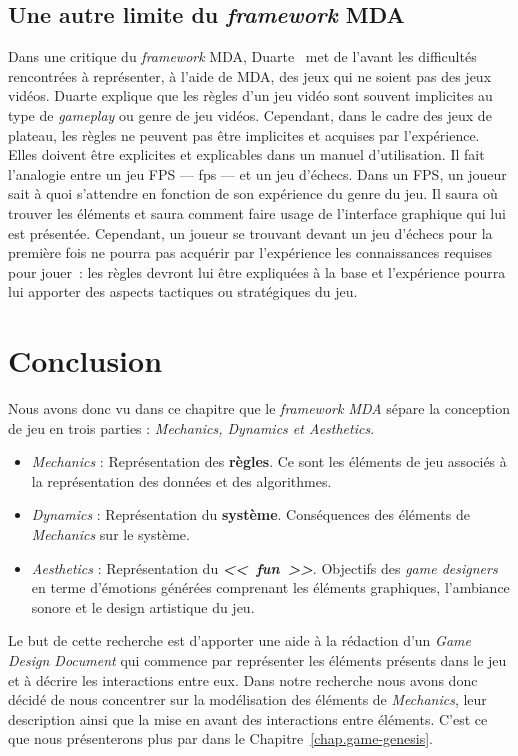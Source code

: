 \subsection{Une autre limite du \emph{framework} MDA}
Dans une critique du \emph{framework} MDA, Duarte~\cite{GAMA_MDA} met de l'avant les difficultés  rencontr\'ees à représenter, \`a l'aide de MDA, des jeux qui ne soient pas des jeux vidéos. 
Duarte explique que les règles d'un jeu vidéo sont souvent implicites au type de \emph{gameplay} ou genre de jeu vidéos. 
Cependant, dans le cadre des jeux de plateau, les règles ne peuvent pas être implicites et acquises par l'expérience. 
Elles doivent être explicites et explicables dans un manuel d'utilisation. 
Il fait l'analogie entre un jeu FPS --- \gls{fps} --- et un jeu d'échecs. Dans un FPS, un joueur sait à quoi s'attendre en fonction de son expérience du genre du jeu. 
Il saura o\`u trouver les éléments et saura comment faire usage de l'interface graphique qui lui est présentée. 
Cependant, un joueur se trouvant devant un jeu d'échecs pour la première fois ne pourra pas acquérir par l'exp\'erience les connaissances requises pour jouer~: les règles devront lui être expliquées à la base et l'expérience pourra lui apporter des aspects tactiques ou strat\'egiques du jeu.

\section{Conclusion}

Nous avons donc vu dans ce chapitre que le \emph{framework MDA} sépare la conception de jeu en trois parties : \emph{Mechanics, Dynamics et Aesthetics}.
\begin{itemize}
    \item \emph{Mechanics} : Représentation des \textbf{règles}. Ce sont les éléments de jeu associés à la représentation des données et des algorithmes.
    \item \emph{Dynamics} : Représentation du \textbf{système}. Conséquences des éléments de \emph{Mechanics} sur le système.
    \item \emph{Aesthetics} : Représentation du \textbf{\emph{<<~fun~>>}}. Objectifs des \emph{game designers} en terme d'émotions générées comprenant les éléments graphiques, l'ambiance sonore et le design artistique du jeu.
\end{itemize}
Le but de cette recherche est d'apporter une aide à la rédaction d'un \emph{Game Design Document} qui commence par représenter les éléments présents dans le jeu et à décrire les interactions entre eux.
Dans notre recherche nous avons donc décidé de nous concentrer sur la modélisation des éléments de \emph{Mechanics}, leur description ainsi que la mise en avant des interactions entre éléments.
C'est ce que nous présenterons plus par dans le Chapitre~\ref{chap.game-genesis}.
